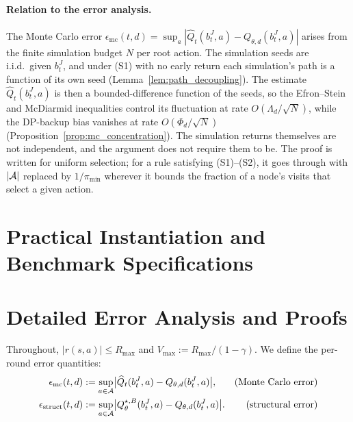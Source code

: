 \paragraph{Relation to the error analysis.}
The Monte Carlo error $\epsilon_{\mathrm{mc}}(t,d)=\sup_a|\widehat Q_t(b_t^J,a)-Q_{\theta,d}(b_t^J,a)|$ arises from the finite simulation budget $N$ per root action.
The simulation seeds are i.i.d.\ given $b_t^J$, and under (S1) with no early return each simulation's path is a function of its own seed (Lemma~\ref{lem:path_decoupling}).
The estimate $\widehat Q_t(b_t^J,a)$ is then a bounded-difference function of the seeds, so the Efron--Stein and McDiarmid inequalities control its fluctuation at rate $O(\Lambda_d/\sqrt N)$, while the DP-backup bias vanishes at rate $O(\Phi_d/\sqrt{N})$ (Proposition~\ref{prop:mc_concentration}).
The simulation returns themselves are not independent, and the argument does not require them to be.
The proof is written for uniform selection; for a rule satisfying (S1)--(S2), it goes through with $|{\mathcal{A}}|$ replaced by $1/\pi_{\min}$ wherever it bounds the fraction of a node's visits that select a given action.



\section{Practical Instantiation and Benchmark Specifications}
\label{ch08:app:experiments}
\label{alg:pf_mcts_practical}
\label{app:lqr}
\label{fig:lqr-snapshot}
\label{fig:lqr-posterior}
\label{fig:lqr-belief-mean}
\label{app:heartsteps}
\label{fig:heartsteps-all}
\label{fig:heartsteps-snapshot}
\label{fig:heartsteps-posterior}


\section{Detailed Error Analysis and Proofs}
\label{app:proofs}

Throughout, $|r(s,a)|\le R_{\max}$ and $V_{\max}:=R_{\max}/(1-\gamma)$. We define the per-round error quantities:
\begin{align*}
\epsilon_{\mathrm{mc}}(t,d)&:=\sup_{a\in{\mathcal{A}}}\bigl|\widehat Q_t(b_t^J,a)-Q_{\theta,d}(b_t^J,a)\bigr|, &\text{(Monte Carlo error)}\\
\epsilon_{\mathrm{struct}}(t,d)&:=\sup_{a\in{\mathcal{A}}}\bigl|Q_{\theta}^{\star,B}(b_t^J,a)-Q_{\theta,d}(b_t^J,a)\bigr|. &\text{(structural error)}
\end{align*}


